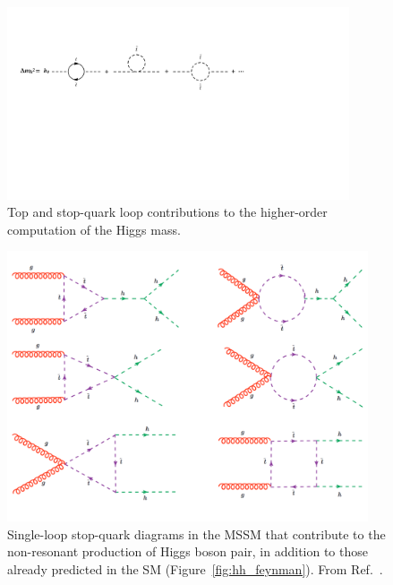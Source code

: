 \begin{figure}[!htb]
    \begin{center}
        \includegraphics[width=0.9\textwidth]{figures/higgs_corr/higgs_mass_corrections_stopPDF}
        \caption{
            Top and stop-quark loop contributions to the higher-order computation of the
            Higgs mass.
        }
        \label{fig:higgs_mass_correction_stop}
    \end{center}
\end{figure}

\begin{figure}[!htb]
    \begin{center}
        \includegraphics[width=0.95\textwidth]{figures/higgs_corr/hh_stopsPDF}
        \caption{
            Single-loop stop-quark diagrams in the MSSM that contribute to the non-resonant production
            of Higgs boson pair, in addition to those already predicted in the SM (Figure~\ref{fig:hh_feynman}). From Ref.~\cite{LightStopsHiggs}.
        }
        \label{fig:hh_stops}
    \end{center}
\end{figure}

